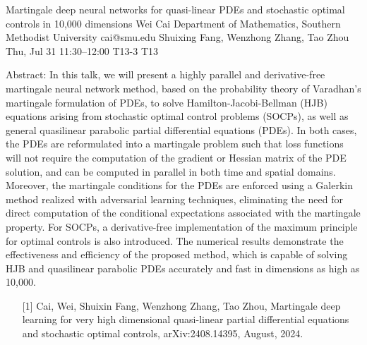 \begin{talk}
  {Martingale deep neural networks for quasi-linear PDEs and stochastic optimal controls in 10,000 dimensions}%
  {Wei Cai}%
  {Department of Mathematics, Southern Methodist University}%
  {cai@smu.edu}%
  {Shuixing Fang, Wenzhong Zhang, Tao Zhou}%
  {}%
  {Thu, Jul 31 11:30–12:00}%
  {T13-3}%
  {T13}%
  
				
			
Abstract: In this talk, we will present a highly parallel and derivative-free martingale neural network method, based on the probability theory of Varadhan’s martingale formulation of PDEs, to solve Hamilton-Jacobi-Bellman (HJB) equations arising from stochastic optimal control problems (SOCPs), as well as general quasilinear parabolic partial differential equations (PDEs). In both cases, the PDEs are reformulated into a martingale problem such that loss functions will not require the computation of the gradient or Hessian matrix of the PDE solution, and can be computed in parallel in both time and spatial domains. Moreover, the martingale conditions for the PDEs are enforced using a Galerkin method realized with adversarial learning techniques, eliminating the need for direct computation of the conditional expectations associated with the martingale property. For SOCPs, a derivative-free implementation of the maximum principle for optimal controls is also introduced. The numerical results demonstrate the effectiveness and efficiency of the proposed method, which is capable of solving HJB and quasilinear parabolic PDEs accurately and fast in dimensions as high as 10,000.

\medskip

\begin{enumerate}
	\item[{[1]}] Cai,  Wei, Shuixin Fang, Wenzhong Zhang, Tao Zhou, Martingale deep learning for very high dimensional quasi-linear partial differential equations and stochastic optimal controls,  arXiv:2408.14395, August, 2024. 
\end{enumerate}

 
\end{talk}

